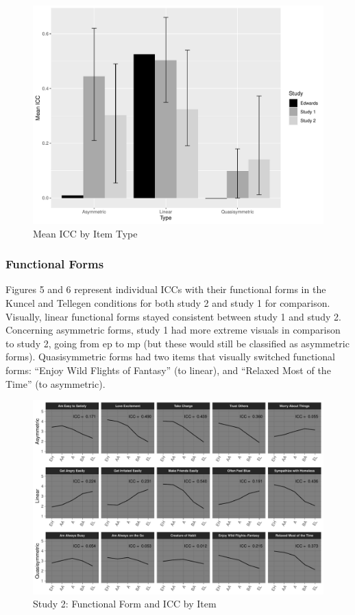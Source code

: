 \documentclass[
  ,jou]{apa6}
\begin{document}
\begin{figure}
\centering
\includegraphics{FullStudy_files/figure-latex/Figure5-1.pdf}
\caption{\label{fig:Figure5} Mean ICC by Item Type}
\end{figure}

\subsubsection{Functional Forms}\label{functional-forms}

Figures 5 and 6 represent individual ICCs with their functional forms in the Kuncel and Tellegen conditions for both study 2 and study 1 for comparison. Visually, linear functional forms stayed consistent between study 1 and study 2. Concerning asymmetric forms, study 1 had more extreme visuals in comparison to study 2, going from ep to mp (but these would still be classified as asymmetric forms). Quasisymmetric forms had two items that visually switched functional forms: ``Enjoy Wild Flights of Fantasy'' (to linear), and ``Relaxed Most of the Time'' (to asymmetric).

\begin{figure}
\centering
\includegraphics{FullStudy_files/figure-latex/Figure7-1.pdf}
\caption{\label{fig:Figure7}Study 2: Functional Form and ICC by Item}
\end{figure}
\end{document}
